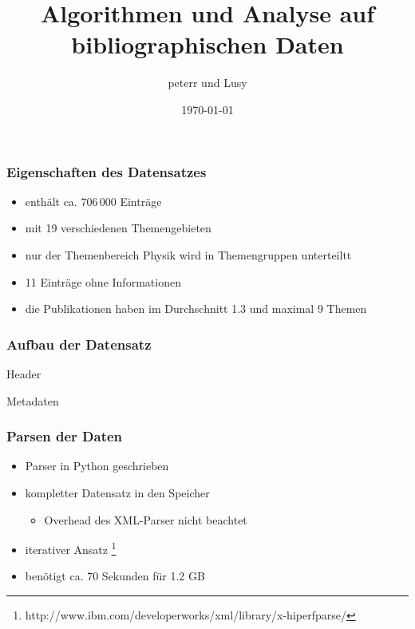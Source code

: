 \documentclass[12pt, xcolor=table]{beamer}
\begin{document}
\title{Algorithmen und Analyse auf bibliographischen Daten}   
\author{peterr und Lusy} 
\date{\today} 

\begin{frame}
	\titlepage
\end{frame}

\begin{frame}
	\frametitle{Eigenschaften des Datensatzes}
	\begin{itemize}
		\item  enthält ca. $706\,000$ Einträge 
		\item  mit 19 verschiedenen Themengebieten 
		\item  nur der Themenbereich Physik wird in Themengruppen unterteiltt
		\item  11 Einträge ohne Informationen
		\item  die Publikationen haben im Durchschnitt 1.3 und maximal 9 Themen
	\end{itemize} 
\end{frame}
\begin{frame}[fragile]
	\frametitle{Aufbau der Datensatz}
	\begin{block}{Header}
		
	\end{block}
	\begin{block}{Metadaten}
		
	\end{block}
\end{frame}
\begin{frame}
	\frametitle{Parsen der Daten}
	\begin{itemize}
		\item  Parser in Python geschrieben 
		\item  kompletter Datensatz in den Speicher
			\begin{itemize}
				\item Overhead des XML-Parser nicht beachtet
			\end{itemize}
		\item iterativer Ansatz \footnote{http://www.ibm.com/developerworks/xml/library/x-hiperfparse/}
		\item benötigt ca. 70 Sekunden für 1.2 GB
	\end{itemize}
\end{frame}
\end{document}
